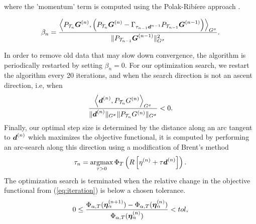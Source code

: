 where the 'momentum' term is computed using the Polak-Ribi$\grave{\text{e}}$re approach \cite{nocedal_numerical_2000}.
\begin{small}
\begin{equation}
\beta_n = \frac{\left\langle P_{\mathcal{T}_n}\boldsymbol G^{(n)}, \left( P_{\mathcal{T}_n}\boldsymbol G^{(n)} - \Gamma_{\tau_{n-1}\boldsymbol d^{n-1}}P_{\mathcal{T}_{n-1}} \boldsymbol G^{(n-1)} \right) \right\rangle_{G^\sigma}}{\|P_{\mathcal{T}_{n-1}} \boldsymbol G^{(n-1)}\|_{G^\sigma}^2}.
\end{equation}
\end{small}
\noindent In order to remove old data that may slow down convergence, the algorithm is periodically restarted by setting $\beta_n = 0$. For our optimization search, we restart the algorithm every 20 iterations, and when the search direction is not an ascent direction, i.e, when
\begin{equation}
\frac{\left\langle \boldsymbol d^{(n)},P_{\mathcal{T}_n}G^{(n)} \right\rangle_{G^\sigma}}{\|\boldsymbol d^{(n)}\|_{G^\sigma}\|P_{\mathcal{T}_n}G^{(n)}\|_{G^\sigma}} < 0.
\end{equation}
Finally, our optimal step size is determined by the distance along an arc tangent to $\boldsymbol d^{(n)}$ which maximizes the objective functional, it is computed by performing an arc-search along this direction using a modification of Brent's method
\begin{equation}\label{eq:step:size}
\tau_n = \operatorname*{argmax}_{\tau > 0} \Phi_T\left( R\left[ \eta^{(n)} + \tau \boldsymbol d^{(n)} \right] \right).
\end{equation}
The optimization search is terminated when the relative change in the objective functional from (\ref{eq:iteration}) is below a chosen tolerance.
\begin{equation}\label{eq:stop}
0 \leq \frac{\Phi_{\alpha,T}({\boldsymbol \eta_\alpha^{(n+1)}})-\Phi_{\alpha,T}({\boldsymbol \eta_\alpha^{(n)}})}{\Phi_{\alpha,T}({\boldsymbol \eta_\alpha^{(n)}})} < tol,
\end{equation}
